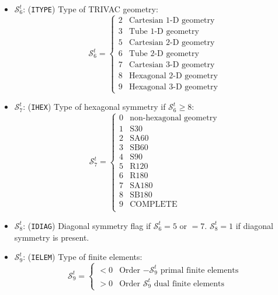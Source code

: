 \begin{itemize}
\item $\mathcal{S}^{t}_{6}$: ({\tt ITYPE}) Type of TRIVAC geometry:
\begin{displaymath}
\mathcal{S}^{t}_{6} = \left\{
\begin{array}{rl}
 2 & \textrm{Cartesian 1-D geometry} \\
 3 & \textrm{Tube 1-D geometry} \\
 5 & \textrm{Cartesian 2-D geometry} \\
 6 & \textrm{Tube 2-D geometry} \\
 7 & \textrm{Cartesian 3-D geometry} \\
 8 & \textrm{Hexagonal 2-D geometry} \\
 9 & \textrm{Hexagonal 3-D geometry}
\end{array} \right.
\end{displaymath}

\item $\mathcal{S}^{t}_{7}$: ({\tt IHEX}) Type of hexagonal symmetry if $\mathcal{S}^{t}_{6}\ge 8$:
\begin{displaymath}
\mathcal{S}^{t}_{7} = \left\{
\begin{array}{rl}
 0 & \textrm{non-hexagonal geometry} \\
 1 & \textrm{S30} \\
 2 & \textrm{SA60} \\
 3 & \textrm{SB60} \\
 4 & \textrm{S90} \\
 5 & \textrm{R120} \\
 6 & \textrm{R180} \\
 7 & \textrm{SA180} \\
 8 & \textrm{SB180} \\
 9 & \textrm{COMPLETE} \\
\end{array} \right.
\end{displaymath}

\item $\mathcal{S}^{t}_{8}$: ({\tt IDIAG}) Diagonal symmetry flag if $\mathcal{S}^{t}_{6}=5$ or $=7$.
$\mathcal{S}^{t}_{8}=1$ if diagonal symmetry is present.

\item $\mathcal{S}^{t}_{9}$: ({\tt IELEM}) Type of finite elements:
\begin{displaymath}
\mathcal{S}^{t}_{9} = \left\{
\begin{array}{rl}
 <0 & \textrm{Order $-\mathcal{S}^{t}_{9}$ primal finite elements} \\
 >0 & \textrm{Order $\mathcal{S}^{t}_{9}$ dual finite elements}
\end{array} \right.
\end{displaymath}


\end{itemize}
